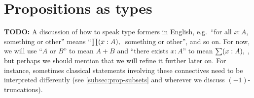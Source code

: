 \section{Propositions as types}
\label{sec:pat}

\textbf{TODO:} A discussion of how to speak type formers in English, e.g.\ ``for all $x:A$, something or other'' means ``$\prd{x:A}$ something or other'', and so on.
For now, we will use ``$A$ or $B$'' to mean $A+B$ and ``there exists $x:A$'' to mean $\sm{x:A}$, but perhaps we should mention that we will refine it further later on.
For instance, sometimes classical statements involving these connectives need to be interpreted differently (see \autoref{subsec:prop-subsets} and wherever we discuss $(-1)$-truncations).


